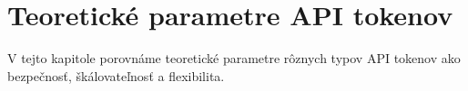 \chapter{Teoretické parametre API tokenov}

\label{kap:teoreticke} %

V tejto kapitole porovnáme teoretické parametre rôznych typov API tokenov ako bezpečnosť, škálovateľnosť a flexibilita.
